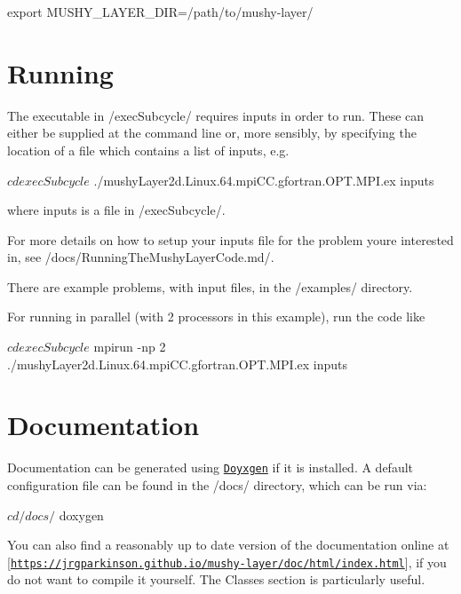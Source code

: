 \begin{DoxyCode}
export MUSHY\_LAYER\_DIR=/path/to/mushy-layer/
\end{DoxyCode}


\section*{Running}

The executable in {\ttfamily /exec\+Subcycle/} requires inputs in order to run. These can either be supplied at the command line or, more sensibly, by specifying the location of a file which contains a list of inputs, e.\+g.


\begin{DoxyCode}
$ cd execSubcycle
$ ./mushyLayer2d.Linux.64.mpiCC.gfortran.OPT.MPI.ex inputs
\end{DoxyCode}


where inputs is a file in {\ttfamily /exec\+Subcycle/}.

For more details on how to setup your inputs file for the problem you\textquotesingle{}re interested in, see {\ttfamily /docs/\+Running\+The\+Mushy\+Layer\+Code.md/}.

There are example problems, with input files, in the {\ttfamily /examples/} directory.

For running in parallel (with 2 processors in this example), run the code like


\begin{DoxyCode}
$ cd execSubcycle
$ mpirun -np 2 ./mushyLayer2d.Linux.64.mpiCC.gfortran.OPT.MPI.ex inputs
\end{DoxyCode}


\section*{Documentation}

Documentation can be generated using \href{http://www.doxygen.nl/}{\tt Doyxgen} if it is installed. A default configuration file can be found in the {\ttfamily /docs/} directory, which can be run via\+:


\begin{DoxyCode}
$ cd /docs/
$ doxygen
\end{DoxyCode}


You can also find a reasonably up to date version of the documentation online at \mbox{[}\href{https://jrgparkinson.github.io/mushy-layer/doc/html/index.html}{\tt https\+://jrgparkinson.\+github.\+io/mushy-\/layer/doc/html/index.\+html}\mbox{]}, if you do not want to compile it yourself. The Classes section is particularly useful.

